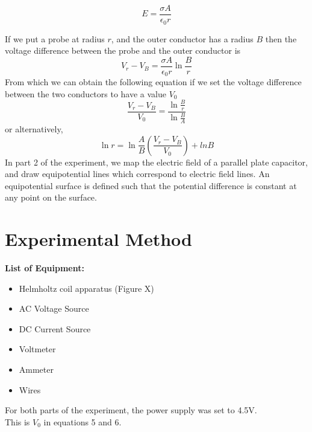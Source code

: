 \documentclass[letterpaper]{article}
\begin{document}
\begin{equation}
  E=\frac{\sigma A}{\epsilon_0 r}
\end{equation}

If we put a probe at radius $r$, and the outer conductor has a radius $B$ then the voltage
difference between the probe and the outer conductor is
\begin{equation}
  V_r-V_B=\frac{\sigma A}{\epsilon_0 r} \ln{\frac{B}{r}}
\end{equation}
From which we can obtain the following equation if we set the voltage difference between the two conductors to have a value $V_0$
\begin{equation}
  \frac{V_r-V_B}{V_0}=\frac{\ln{\frac{B}{r}}}{\ln{\frac{B}{A}}}
\end{equation}
or alternatively,
\begin{equation}
  \ln{r} =\ln{\frac{A}{B}}(\frac{V_r-V_B}{V_0}) + ln{B}
\end{equation}
In part 2 of the experiment, we map the electric field of a parallel plate capacitor, and draw equipotential lines
which correspond to electric field lines. An equipotential surface is defined such that the
potential difference is constant at any point on the surface.


\section{Experimental Method}

\textbf{List of Equipment:}
\begin{itemize}
  \item Helmholtz coil apparatus (Figure X)
  \item AC Voltage Source
  \item DC Current Source
  \item Voltmeter
  \item Ammeter
  \item Wires
\end{itemize}
For both parts of the experiment, the power supply was set to 4.5V. \\This is $V_0$ in equations 5 and 6.
\newpage
\end{document}
